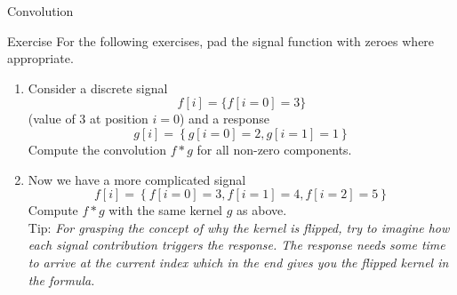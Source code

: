   \begin{frame}{Convolution}
    \begin{exampleblock}{Exercise}
    For the following exercises, pad the signal function with zeroes where
    appropriate.
      \begin{enumerate}
        \item Consider a discrete signal
          \begin{equation*}
            f[i] = \{f[i=0] = 3 \}
          \end{equation*}
          (value of $3$ at position $i=0$) and a response
          \begin{equation*}
            g[i] = \left\{g[i=0] = 2, g[i=1] = 1\right\}
          \end{equation*}
          Compute the convolution $f*g$ for all non-zero components.
        \item Now we have a more complicated signal
          \begin{equation*}
            f[i] = \left\{f[i=0] = 3, f[i=1] = 4, f[i=2] = 5\right\}
          \end{equation*}
          Compute $f*g$ with the same kernel $g$ as above. \\
          {\footnotesize Tip: \emph{For grasping the concept of why the kernel is flipped, try
          to imagine how each signal contribution triggers the response. The
          response needs some time to arrive at the current index which in the
          end gives you the flipped kernel in the formula.}}
      \end{enumerate}
    \end{exampleblock}
  \end{frame}

